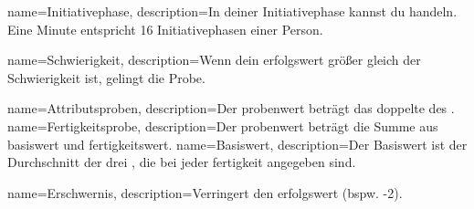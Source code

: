 {
    name=Initiativephase,
    description={In deiner Initiativephase kannst du handeln. Eine Minute entspricht 16 Initiativephasen einer Person.}
}

{
	name={Schwierigkeit},
	description={Wenn dein \gls{erfolgswert} größer gleich der Schwierigkeit ist, gelingt die Probe.}
}

{
    name={Attributsproben},
    description={Der \gls{probenwert} beträgt das doppelte des .}
}
{
    name={Fertigkeitsprobe},
    description={Der \gls{probenwert} beträgt die Summe aus \gls{basiswert} und \gls{fertigkeitswert}.}
}
{
    name={Basiswert},
    description={Der Basiswert ist der Durchschnitt der drei , die bei jeder \gls{fertigkeit} angegeben sind.}}

{
    name={Erschwernis},
    description={Verringert den \gls{erfolgswert} (bspw. -2).}}
    
